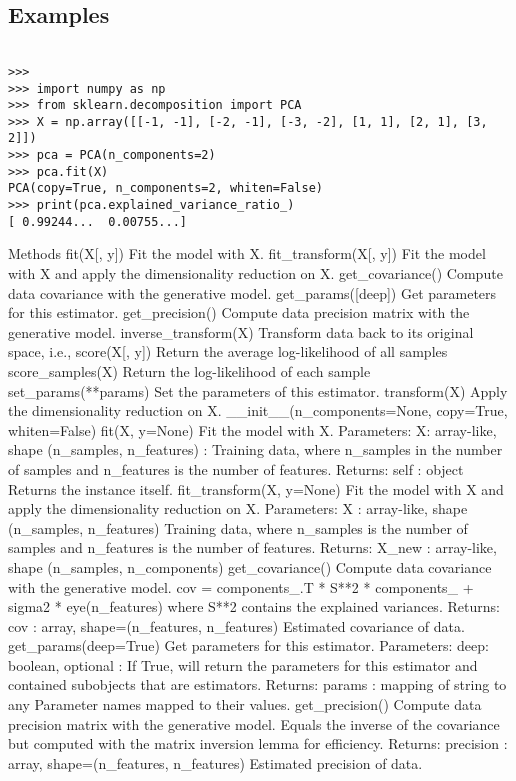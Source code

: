\subsection*{Examples}
\begin{framed}
\begin{verbatim}

>>>
>>> import numpy as np
>>> from sklearn.decomposition import PCA
>>> X = np.array([[-1, -1], [-2, -1], [-3, -2], [1, 1], [2, 1], [3, 2]])
>>> pca = PCA(n_components=2)
>>> pca.fit(X)
PCA(copy=True, n_components=2, whiten=False)
>>> print(pca.explained_variance_ratio_) 
[ 0.99244...  0.00755...]
\end{verbatim}
\end{framed}
Methods
fit(X[, y]) Fit the model with X.
fit_transform(X[, y]) Fit the model with X and apply the dimensionality reduction on X.
get_covariance() Compute data covariance with the generative model.
get_params([deep]) Get parameters for this estimator.
get_precision() Compute data precision matrix with the generative model.
inverse_transform(X) Transform data back to its original space, i.e.,
score(X[, y]) Return the average log-likelihood of all samples
score_samples(X) Return the log-likelihood of each sample
set_params(**params) Set the parameters of this estimator.
transform(X) Apply the dimensionality reduction on X.
__init__(n_components=None, copy=True, whiten=False)
fit(X, y=None)
Fit the model with X.
Parameters: 
X: array-like, shape (n_samples, n_features) :
Training data, where n_samples in the number of samples and n_features is the number of features.
Returns: 
self : object
Returns the instance itself.
fit_transform(X, y=None)
Fit the model with X and apply the dimensionality reduction on X.
Parameters: 
X : array-like, shape (n_samples, n_features)
Training data, where n_samples is the number of samples and n_features is the number of features.
Returns: 
X_new : array-like, shape (n_samples, n_components)
get_covariance()
Compute data covariance with the generative model.
cov = components_.T * S**2 * components_ + sigma2 * eye(n_features) where S**2 contains the explained variances.
Returns: 
cov : array, shape=(n_features, n_features)
Estimated covariance of data.
get_params(deep=True)
Get parameters for this estimator.
Parameters: 
deep: boolean, optional :
If True, will return the parameters for this estimator and contained subobjects that are estimators.
Returns: 
params : mapping of string to any
Parameter names mapped to their values.
get_precision()
Compute data precision matrix with the generative model.
Equals the inverse of the covariance but computed with the matrix inversion lemma for efficiency.
Returns: 
precision : array, shape=(n_features, n_features)
Estimated precision of data.
